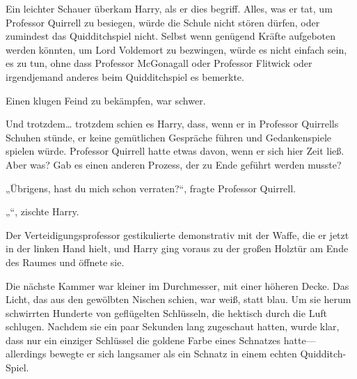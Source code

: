 Ein leichter Schauer überkam Harry, als er dies begriff. Alles, was er tat, um Professor Quirrell zu besiegen, würde die Schule nicht stören dürfen, oder zumindest das Quidditchspiel nicht. Selbst wenn genügend Kräfte aufgeboten werden könnten, um Lord Voldemort zu bezwingen, würde es nicht einfach sein, es zu tun, ohne dass Professor McGonagall oder Professor Flitwick oder irgendjemand anderes beim Quidditchspiel es bemerkte.

Einen klugen Feind zu bekämpfen, war schwer.

Und trotzdem… trotzdem schien es Harry, dass, wenn er in Professor Quirrells Schuhen stünde, er keine gemütlichen Gespräche führen und Gedankenspiele spielen würde. Professor Quirrell hatte etwas davon, wenn er sich hier Zeit ließ. Aber was? Gab es einen anderen Prozess, der zu Ende geführt werden musste?

„Übrigens, hast du mich schon verraten?“, fragte Professor Quirrell.

„“, zischte Harry.

Der Verteidigungsprofessor gestikulierte demonstrativ mit der Waffe, die er jetzt in der linken Hand hielt, und Harry ging voraus zu der großen Holztür am Ende des Raumes und öffnete sie.

\later

Die nächste Kammer war kleiner im Durchmesser, mit einer höheren Decke. Das Licht, das aus den gewölbten Nischen schien, war weiß, statt blau.
Um sie herum schwirrten Hunderte von geflügelten Schlüsseln, die hektisch durch die Luft schlugen. Nachdem sie ein paar Sekunden lang zugeschaut hatten, wurde klar, dass nur ein einziger Schlüssel die goldene Farbe eines Schnatzes hatte—allerdings bewegte er sich langsamer als ein Schnatz in einem echten Quidditch-Spiel.

